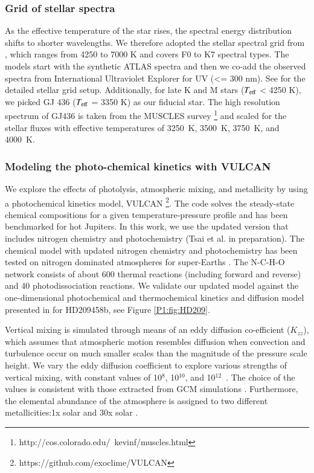 \subsubsection{Grid of stellar spectra}

As the effective temperature of the star rises, the spectral energy distribution shifts to shorter wavelengths. We therefore adopted the stellar spectral grid from \citep{Rugheimer2013}, which ranges from 4250 to 7000 K and covers F0 to K7 spectral types. The models start with the synthetic ATLAS spectra \citep{Kurucz1979} and then we co-add the observed spectra from International Ultraviolet Explorer for UV (<= 300 nm). See \citep{Rugheimer2013} for the detailed stellar grid setup. Additionally, for late K and M stars ($T_{\rm eff}$ < 4250 K), we picked GJ 436 ($T_{\rm eff}$ = 3350 K) as our fiducial star. The high resolution spectrum of GJ436 is taken from the MUSCLES survey \citep{France2016}\footnote{http://cos.colorado.edu/~kevinf/muscles.html} and scaled for the stellar fluxes with effective temperatures of 3250~K, 3500~K, 3750~K, and 4000~K.

\subsubsection{Modeling the photo-chemical kinetics with VULCAN}
\label{P1:subsec:VULCAN}

We explore the effects of photolysis, atmospheric mixing, and metallicity by using a photochemical kinetics model, VULCAN \citep{Tsai2017}\footnote{https://github.com/exoclime/VULCAN}. The code solves the steady-state chemical compositions for a given temperature-pressure profile and has been benchmarked for hot Jupiters. In this work, we use the updated version that includes nitrogen chemistry and photochemistry (Tsai et al. in preparation). The chemical model with updated nitrogen chemistry and photochemistry has been tested on nitrogen dominated atmospheres for super-Earths \citep{Zilinskas2020}. The N-C-H-O network consists of about 600 thermal reactions (including forward and reverse) and 40 photodissociation reactions. We validate our updated model against the one-dimensional photochemical and thermochemical kinetics and diffusion model presented in \citet{Moses2011} for HD209458b, see Figure \ref{P1:fig:HD209}.

Vertical mixing is simulated through means of an eddy diffusion co-efficient ($K_{zz}$), which assumes that atmospheric motion resembles diffusion when convection and turbulence occur on much smaller scales than the magnitude of the pressure scale height. We vary the eddy diffusion coefficient to explore various strengths of vertical mixing, with constant values of 10$^8$, 10$^{10}$, and 10$^{12}$~\cmcms. The choice of the values is consistent with those extracted from GCM simulations \citep{Moses2011, Parmentier2013, Zhang2018b, Komacek2019}. Furthermore, the elemental abundance of the atmosphere is assigned to two different metallicities:1x solar and 30x solar \citep{Lodders2009}.


